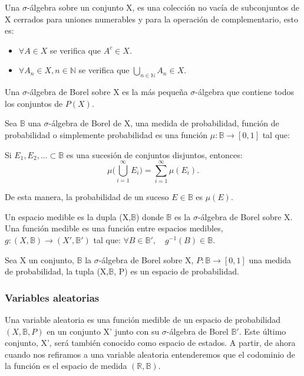 \documentclass[../proyecto.tex]{memoir}
\begin{document}
Una $\sigma$-álgebra sobre un conjunto X, es una colección no vacía de subconjuntos de X cerrados para uniones numerables y para la operación de complementario, esto es:
\begin{itemize}
\item $\forall A \in X$ se verifica que $A^{c} \in X$.
\item $ \forall A_{n} \in X, n \in \mathds{N} $ se verifica que $\bigcup _{n \in \mathds{N}} A_{n} \in X$.
\end{itemize}
 
Una $\sigma$-álgebra de Borel sobre X es la más pequeña $\sigma$-álgebra que contiene todos los conjuntos de $P(X)$. 
 
Sea $\mathds{B}$ una $\sigma$-álgebra de Borel de X, una medida de probabilidad, función de probabilidad o simplemente probabilidad es una función $\mu: \mathds{B} \rightarrow [0,1] $ tal que: 

Si $E_{1}, E_{2},... \subset \mathds{B}$ es una sucesión de conjuntos disjuntos, entonces:
\begin{equation*}
 \mu \big( \bigcup _{i=1} ^{\infty} E_{i} \big) = \sum _{i=1}^{\infty} \mu ( E_{i} ).
\end{equation*}

De esta manera, la probabilidad de un suceso $E \in \mathds{B}$ es $\mu(E)$.

Un espacio medible es la dupla (X,$\mathds{B}$) donde $\mathds{B}$ es la $\sigma$-álgebra de Borel sobre X. Una función medible es una función entre espacios medibles, $g:  (X,\mathds{B}) \rightarrow (X',\mathds{B}')$ tal que: $ \forall B \in \mathds{B}', \quad g^{-1}(B) \in \mathds{B}$.

Sea X un conjunto, $\mathds{B}$ la $\sigma$-álgebra de Borel sobre X, $P: \mathds{B} \rightarrow [0,1] $ una medida de probabilidad, la tupla (X,$\mathds{B}$, P) es un espacio de probabilidad. 

\subsubsection{Variables aleatorias}

Una variable aleatoria es una función medible de un espacio de probabilidad $(X, \mathds{B}, P)$ en un conjunto X' junto con su $\sigma$-álgebra de Borel $\mathds{B}'$. Este último conjunto, X', será también conocido como espacio de estados. A partir, de ahora cuando nos refiramos a una variable aleatoria entenderemos que el codominio de la función es el espacio de medida $(\mathds{R},\mathds{B})$.
\end{document}
